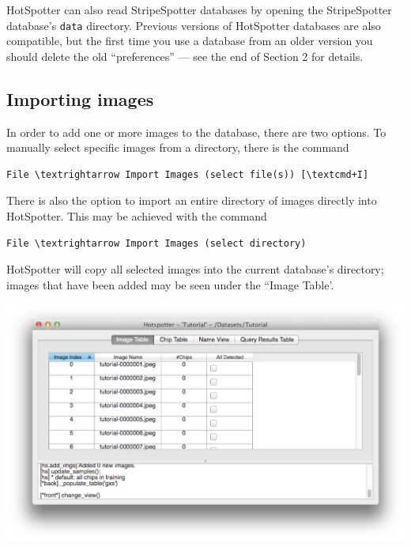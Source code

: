 \documentclass[a4paper,10pt]{article}
\begin{document}
    HotSpotter can also read StripeSpotter databases by opening the
    StripeSpotter database's {\tt data} directory.  Previous versions of HotSpotter databases
   are also compatible, but the first time you use a database from an older version you should delete the old ``preferences'' --- see the end of Section 2 for details.  
    
    \subsection{Importing images}
        In order to add one or more images to the database, there are two options. To manually select specific images from a directory, there is the command
        \begin{Verbatim}[commandchars=\\\{\}]
        File \textrightarrow Import Images (select file(s)) [\textcmd+I]
        \end{Verbatim}
        There is also the option to import an entire directory of images directly into HotSpotter.  This may be achieved with the command 
        \begin{Verbatim}[commandchars=\\\{\}]
        File \textrightarrow Import Images (select directory)
        \end{Verbatim}
         HotSpotter will copy all selected images into the current database's directory; images that have been added may be seen under the ``Image Table'. 

        \begin{center}
            \includegraphics[scale=0.15]{images/added.png}
        \end{center}
   
\end{document}
